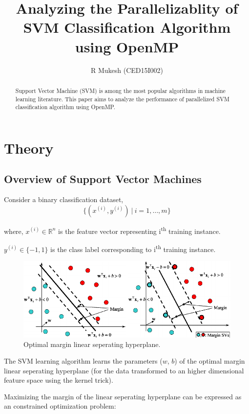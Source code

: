 \documentclass{article}
\title{Analyzing the Parallelizablity of SVM Classification Algorithm using OpenMP}
\author{R Mukesh (CED15I002)}
\affil{IIITDM Kancheepuram}
\date{}
\newcommand{\R}{\mathbb{R}}
\begin{document}
\maketitle

\begin{abstract}
Support Vector Machine (SVM) is among the most popular algorithms in machine learning literature. This paper aims to analyze the performance of parallelized SVM classification algorithm using OpenMP.
\end{abstract}

\section{Theory}

	\subsection{Overview of Support Vector Machines}
	
		Consider a binary classification dataset,
			\[
				\{(x^{(i)}, y^{(i)})\ |\ i=1, \ldots, m\}
			\]			
		
		where, 	$x^{(i)} \in \R^n$ is the feature vector representing i\textsuperscript{th} training instance.\par
		\hspace{32pt}$y^{(i)} \in \{-1, 1\}$ is the class label corresponding to i\textsuperscript{th} training instance.\par
		
		\begin{figure}[!htbp]
			\centering
			\includegraphics[scale=0.4]{svm}
			\caption{Optimal margin linear seperating hyperplane.}
		\end{figure}
		
		The SVM learning algorithm learns the parameters ($w$, $b$) of the optimal margin linear seperating hyperplane (for the data transformed to an higher dimensional feature space using the kernel trick).
		
		Maximizing the margin of the linear seperating hyperplane can be expressed as an constrained optimization problem:
		
\end{document}
